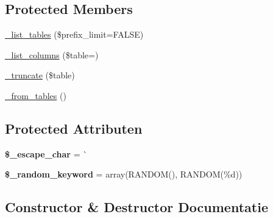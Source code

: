 \subsection*{Protected Members}
\begin{DoxyCompactItemize}
\item 
\mbox{\hyperlink{class_c_i___d_b__pdo__cubrid__driver_a435c0f3ce54fe7daa178baa8532ebd54}{\+\_\+list\+\_\+tables}} (\$prefix\+\_\+limit=F\+A\+L\+SE)
\item 
\mbox{\hyperlink{class_c_i___d_b__pdo__cubrid__driver_a7ccb7f9c301fe7f0a9db701254142b63}{\+\_\+list\+\_\+columns}} (\$table=\textquotesingle{}\textquotesingle{})
\item 
\mbox{\hyperlink{class_c_i___d_b__pdo__cubrid__driver_aa029600528fc1ce660a23ff4b4667f95}{\+\_\+truncate}} (\$table)
\item 
\mbox{\hyperlink{class_c_i___d_b__pdo__cubrid__driver_aef43f7e3e7b71d337ff3724c5eb14f10}{\+\_\+from\+\_\+tables}} ()
\end{DoxyCompactItemize}
\subsection*{Protected Attributen}
\begin{DoxyCompactItemize}
\item 
\mbox{\label{class_c_i___d_b__pdo__cubrid__driver_aaec2fb0112850159063a8e47ad3aed6e}} 
{\bfseries \$\+\_\+escape\+\_\+char} = \textquotesingle{}\`{}\textquotesingle{}
\item 
\mbox{\label{class_c_i___d_b__pdo__cubrid__driver_a10213aa6e05f6d924d3277bb1d2fea00}} 
{\bfseries \$\+\_\+random\+\_\+keyword} = array(\textquotesingle{}R\+A\+N\+D\+OM()\textquotesingle{}, \textquotesingle{}R\+A\+N\+D\+OM(\%d)\textquotesingle{})
\end{DoxyCompactItemize}


\subsection{Constructor \& Destructor Documentatie}
\mbox{\label{class_c_i___d_b__pdo__cubrid__driver_a9162320adff1a1a4afd7f2372f753a3e}} 
